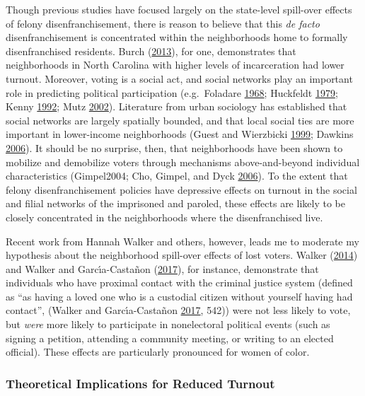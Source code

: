 \documentclass[]{article}
\begin{document}
Though previous studies have focused largely on the state-level spill-over effects of felony disenfranchisement, there is reason to believe that this \emph{de facto} disenfranchisement is concentrated within the neighborhoods home to formally disenfranchised residents. Burch (\protect\hyperlink{ref-Burch2013}{2013}), for one, demonstrates that neighborhoods in North Carolina with higher levels of incarceration had lower turnout. Moreover, voting is a social act, and social networks play an important role in predicting political participation (e.g.~Foladare \protect\hyperlink{ref-Foladare1968}{1968}; Huckfeldt \protect\hyperlink{ref-Huckfeldt1979}{1979}; Kenny \protect\hyperlink{ref-Kenny1992}{1992}; Mutz \protect\hyperlink{ref-Mutz2002}{2002}). Literature from urban sociology has established that social networks are largely spatially bounded, and that local social ties are more important in lower-income neighborhoods (Guest and Wierzbicki \protect\hyperlink{ref-Guest1999}{1999}; Dawkins \protect\hyperlink{ref-Dawkins2006}{2006}). It should be no surprise, then, that neighborhoods have been shown to mobilize and demobilize voters through mechanisms above-and-beyond individual characteristics (Gimpel2004; Cho, Gimpel, and Dyck \protect\hyperlink{ref-Cho2006}{2006}). To the extent that felony disenfranchisement policies have depressive effects on turnout in the social and filial networks of the imprisoned and paroled, these effects are likely to be closely concentrated in the neighborhoods where the disenfranchised live.

Recent work from Hannah Walker and others, however, leads me to moderate my hypothesis about the neighborhood spill-over effects of lost voters. Walker (\protect\hyperlink{ref-Walker2014}{2014}) and Walker and Garcı́a-Castañon (\protect\hyperlink{ref-Walker2017}{2017}), for instance, demonstrate that individuals who have proximal contact with the criminal justice system (defined as ``as having a loved one who is a custodial citizen without yourself having had contact'', (Walker and Garcı́a-Castañon \protect\hyperlink{ref-Walker2017}{2017}, 542)) were not less likely to vote, but \emph{were} more likely to participate in nonelectoral political events (such as signing a petition, attending a community meeting, or writing to an elected official). These effects are particularly pronounced for women of color.

\hypertarget{theoretical-implications-for-reduced-turnout}{%
\subsubsection*{Theoretical Implications for Reduced Turnout}\label{theoretical-implications-for-reduced-turnout}}
\end{document}
